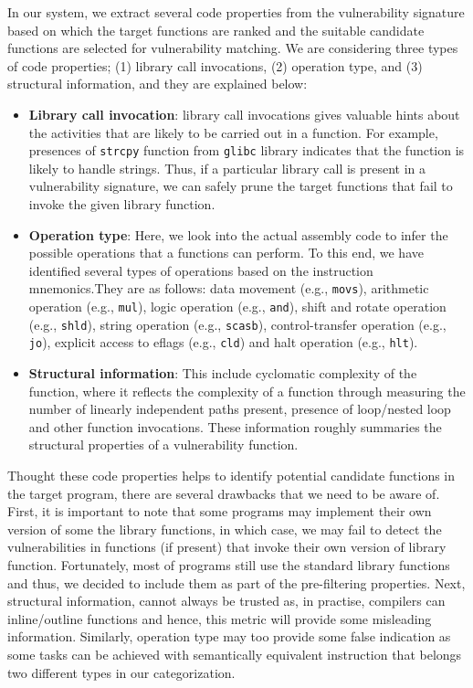 In our system, we extract several code properties from the vulnerability signature based on which the target functions are ranked and the suitable candidate functions are selected for vulnerability matching. We are considering three types of code properties; (1) library call invocations, (2) operation type, and (3) structural information, and they are explained below:

\begin{itemize} 
\item \textbf{Library call invocation}: library call invocations gives valuable hints about the activities that are likely to be carried out in a function. For example, presences of \texttt{strcpy} function from \texttt{glibc} library indicates that the function is likely to handle strings. Thus, if a particular library call is present in a vulnerability signature, we can safely prune the target functions that fail to invoke the given library function.    

\item \textbf{Operation type}: Here, we look into the actual assembly code to infer the possible operations that a functions can perform. To this end, we have identified several types of operations based on the instruction mnemonics.They are as follows: data movement (e.g., \texttt{movs}), arithmetic operation (e.g., \texttt{mul}), logic operation (e.g., \texttt{and}), shift and rotate operation (e.g., \texttt{shld}), string operation (e.g., \texttt{scasb}), control-transfer operation (e.g., \texttt{jo}), explicit access to eflags (e.g., \texttt{cld}) and halt operation (e.g., \texttt{hlt}).
   
\item \textbf{Structural information}: This include cyclomatic complexity of the function, where it reflects the complexity of a function through measuring the number of linearly independent paths present, presence of loop/nested loop and other function invocations. These information roughly summaries the structural properties of a vulnerability function.

\end{itemize}

Thought these code properties helps to identify potential candidate functions in the target program, there are several drawbacks that we need to be aware of. First, it is important to note that some programs may implement their own version of some the library functions, in which case, we may fail to detect the vulnerabilities in functions (if present) that invoke their own version of library function. Fortunately, most of programs still use the standard library functions and thus, we decided to include them as part of the pre-filtering properties. Next, structural information, cannot always be trusted as, in practise, compilers can inline/outline functions and hence, this metric will provide some misleading information. Similarly, operation type may too provide some false indication as some tasks can be achieved with semantically equivalent instruction that belongs two different types in our categorization.

